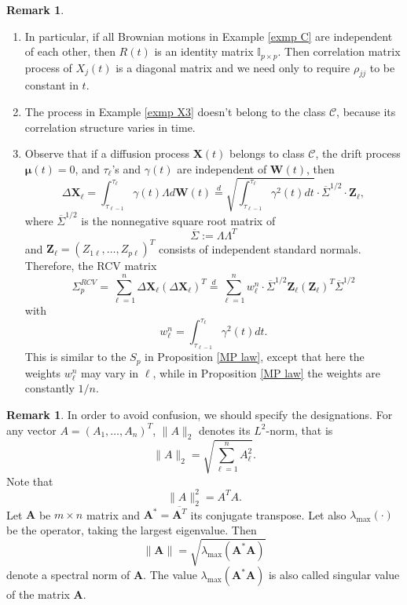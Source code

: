 \documentclass[a4paper,11pt]{article}
\theoremstyle{plain}
\theoremstyle{definition}
\newtheorem{rmrk}[thm]{Remark}
\begin{document}
    \begin{rmrk} \
    	\begin{enumerate}
    		\item In particular, if all Brownian motions in Example \ref{exmp C} are independent of each other, then $R(t)$ is an identity matrix $\mathbb{I}_{p \times p}$. Then correlation matrix process of $X_j(t)$ is a diagonal matrix and we need only to require $\rho_{jj}$ to be constant in $t$. 
    		\item The process in Example \ref{exmp X3} doesn't belong to the class $\mathcal{C}$, because its correlation structure varies in time.
    		\item Observe that if a diffusion process $\mathbf{X}(t)$ belongs to class $\mathcal{C}$, the drift process $\boldsymbol{\mu}(t) = 0$, and $\tau_\ell$'s and $\gamma(t)$ are independent of $\mathbf{W}(t)$, then
    		\[ \Delta \mathbf{X}_\ell = \int_{\tau_{\ell-1}}^{\tau_\ell} \gamma(t) \Lambda d\mathbf{W}(t) \stackrel{d}{=} \sqrt{\int_{\tau_{\ell-1}}^{\tau_\ell} \gamma^2(t)dt} \cdot \overline{\Sigma}^{1/2} \cdot \mathbf{Z}_\ell, \]
    		where $ \overline{\Sigma}^{1/2}$ is the nonnegative square root matrix of
    		\[\overline{\Sigma} := \Lambda \Lambda^T \]
    		and $\mathbf{Z}_\ell = (Z_{1\ell}, \dots, Z_{p\ell})^T$ consists of independent standard normals. Therefore, the RCV matrix
    		\[ \Sigma_p^{RCV} = \sum_{\ell=1}^{n} \Delta \mathbf{X}_\ell(\Delta \mathbf{X}_\ell)^T \stackrel{d}{=} \sum_{\ell=1}^{n} w_\ell^n \cdot \overline{\Sigma}^{1/2}\mathbf{Z}_\ell (\mathbf{Z}_\ell)^T \overline{\Sigma}^{1/2} \]
    		with 
    		\[w_\ell^n =\int_{\tau_{\ell-1}}^{\tau_\ell} \gamma^2(t)dt.\]
    		This is similar to the $S_p$ in Proposition \ref{MP law}, except that here the weights $w_\ell^n$ may vary in $\ell$, while in Proposition \ref{MP law} the weights are constantly $1/n$.
    	\end{enumerate}
    \end{rmrk}
    
    \begin{rmrk}
    	In order to avoid confusion, we should specify the designations. For any vector $A = (A_1, \dots, A_n)^T$, $\|A\|_2$ denotes its $L^2$-norm, that is
    	\[ \|A\|_2 = \sqrt{\sum_{\ell=1}^n A_\ell^2 }. \]
    	Note that
    	\[ \|A\|_2^2 = A^T A. \]
    	Let $\mathbf{A}$ be $m \times n$ matrix and $\mathbf{A}^* = \overline{\mathbf{A}^T}$ its conjugate transpose. Let also $\lambda_{\max}(\cdot)$ be the operator, taking the largest eigenvalue. Then
    	\[ \|\mathbf{A} \| = \sqrt{\lambda_{\max} (\mathbf{A}^* \mathbf{A}) } \]
    	denote a spectral norm of $\mathbf{A}$. The value $\lambda_{\max} (\mathbf{A}^* \mathbf{A})$ is also called singular value of the matrix $\mathbf{A}$.
    \end{rmrk}
    
\end{document}
